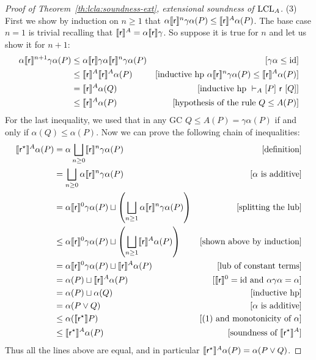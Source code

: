 \begin{proof}[Proof of Theorem~\ref{th:lcla:soundness-ext}, extensional soundness of $\text{LCL}_A$]
	\noindent (3) First we show by induction on $n \ge 1$ that $\alpha \llbracket\mathsf{r}\rrbracket^n \gamma \alpha(P) \le \llbracket\mathsf{r}\rrbracket^{A} \alpha(P)$.
	The base case $n = 1$ is trivial recalling that $\llbracket\mathsf{r}\rrbracket^{A} = \alpha \llbracket\mathsf{r}\rrbracket \gamma$. So suppose it is true for $n$ and let us show it for $n + 1$:
	\begin{align*}
		\alpha \llbracket\mathsf{r}\rrbracket^{n+1} \gamma \alpha(P) &\le \alpha \llbracket\mathsf{r}\rrbracket \gamma \alpha \llbracket\mathsf{r}\rrbracket^n \gamma \alpha(P) &[\gamma \alpha \le \text{id}] \\
		&\le \llbracket\mathsf{r}\rrbracket^{A} \llbracket\mathsf{r}\rrbracket^{A} \alpha(P) &[\text{inductive hp } \alpha \llbracket\mathsf{r}\rrbracket^n \gamma \alpha(P) \le \llbracket\mathsf{r}\rrbracket^{A} \alpha(P)] \\
		&= \llbracket\mathsf{r}\rrbracket^{A} \alpha(Q) &[\text{inductive hp }\vdash_{A}\nobreak[P]~\mathsf{r}~[Q]] \\
		&\le \llbracket\mathsf{r}\rrbracket^{A} \alpha(P) &[\text{hypothesis of the rule }Q \le A(P)]
	\end{align*}
	For the last inequality, we used that in any GC $Q \le A(P) = \gamma \alpha(P)$ if and only if $\alpha(Q) \le \alpha(P)$.
	Now we can prove the following chain of inequalities:
	\begin{align*}
		\llbracket\mathsf{r}^{\star}\rrbracket^{A} \alpha(P) &= \alpha \bigsqcup_{n \ge 0} \llbracket\mathsf{r}\rrbracket^n \gamma \alpha(P) &[\text{definition}] \\
		&= \bigsqcup_{n \ge 0} \alpha \llbracket\mathsf{r}\rrbracket^n \gamma \alpha(P) &[\alpha \text{ is additive}] \\
		&= \alpha \llbracket\mathsf{r}\rrbracket^0 \gamma \alpha(P) \sqcup \left( \bigsqcup_{n \ge 1} \alpha \llbracket\mathsf{r}\rrbracket^n \gamma \alpha(P) \right) &[\text{splitting the lub}] \\
		&\le \alpha \llbracket\mathsf{r}\rrbracket^0 \gamma \alpha(P) \sqcup \left( \bigsqcup_{n \ge 1} \llbracket\mathsf{r}\rrbracket^{A} \alpha(P) \right) &[\text{shown above by induction}] \\
		&= \alpha \llbracket\mathsf{r}\rrbracket^0 \gamma \alpha(P) \sqcup \llbracket\mathsf{r}\rrbracket^{A} \alpha(P) &[\text{lub of constant terms}] \\
		&= \alpha(P) \sqcup \llbracket\mathsf{r}\rrbracket^{A} \alpha(P) &[\llbracket\mathsf{r}\rrbracket^0 = \text{id} \text{ and }\alpha \gamma \alpha = \alpha] \\
		&= \alpha(P) \sqcup \alpha(Q) &[\text{inductive hp}] \\
		&= \alpha(P \lor Q) &[\alpha \text{ is additive}] \\
		&\le \alpha (\llbracket\mathsf{r}^{\star}\rrbracket P) &[\text{(1) and monotonicity of }\alpha] \\
		&\le \llbracket\mathsf{r}^{\star}\rrbracket^{A} \alpha(P) &[\text{soundness of }\llbracket\mathsf{r}^{\star}\rrbracket^{A}]
	\end{align*}
	Thus all the lines above are equal, and in particular $\llbracket\mathsf{r}^{\star}\rrbracket^{A} \alpha(P) = \alpha(P \lor Q)$.
\end{proof}

